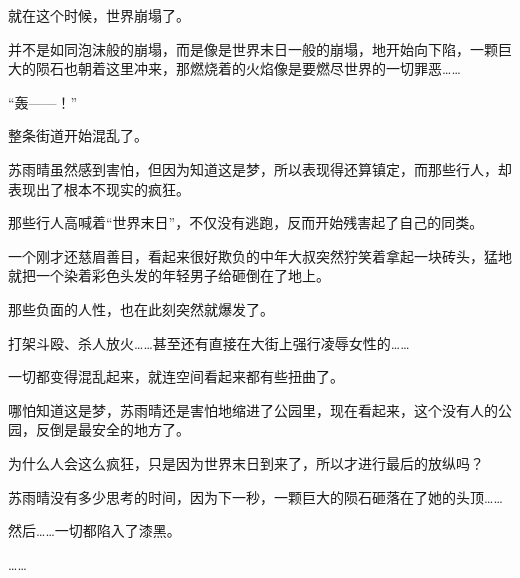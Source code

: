 就在这个时候，世界崩塌了。

并不是如同泡沫般的崩塌，而是像是世界末日一般的崩塌，地开始向下陷，一颗巨大的陨石也朝着这里冲来，那燃烧着的火焰像是要燃尽世界的一切罪恶……

“轰——！”

整条街道开始混乱了。

苏雨晴虽然感到害怕，但因为知道这是梦，所以表现得还算镇定，而那些行人，却表现出了根本不现实的疯狂。

那些行人高喊着“世界末日”，不仅没有逃跑，反而开始残害起了自己的同类。

一个刚才还慈眉善目，看起来很好欺负的中年大叔突然狞笑着拿起一块砖头，猛地就把一个染着彩色头发的年轻男子给砸倒在了地上。

那些负面的人性，也在此刻突然就爆发了。

打架斗殴、杀人放火……甚至还有直接在大街上强行凌辱女性的……

一切都变得混乱起来，就连空间看起来都有些扭曲了。

哪怕知道这是梦，苏雨晴还是害怕地缩进了公园里，现在看起来，这个没有人的公园，反倒是最安全的地方了。

为什么人会这么疯狂，只是因为世界末日到来了，所以才进行最后的放纵吗？

苏雨晴没有多少思考的时间，因为下一秒，一颗巨大的陨石砸落在了她的头顶……

然后……一切都陷入了漆黑。

……
